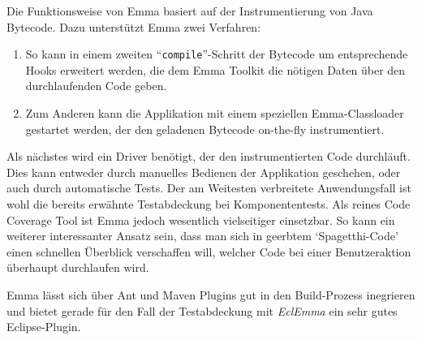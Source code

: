 Die Funktionsweise von Emma basiert auf der Instrumentierung von Java Bytecode. Dazu unterstützt Emma zwei Verfahren: \begin{enumerate}
\item So kann in einem zweiten ``\verb=compile=''-Schritt der Bytecode um entsprechende Hooks erweitert werden, die dem Emma Toolkit die nötigen Daten über den durchlaufenden Code geben.
\item Zum Anderen kann die Applikation mit einem speziellen Emma-Classloader gestartet werden, der den geladenen Bytecode on-the-fly instrumentiert. 
\end{enumerate}
Als nächstes wird ein Driver benötigt, der den instrumentierten Code durchläuft. Dies kann entweder durch manuelles Bedienen der Applikation geschehen, oder auch durch automatische Tests. Der am Weitesten verbreitete Anwendungsfall ist wohl die bereits erwähnte Testabdeckung bei Komponententests. Als reines Code Coverage Tool ist Emma jedoch wesentlich vielseitiger einsetzbar. So kann ein weiterer interessanter Ansatz sein, dass man sich in geerbtem `Spagetthi-Code' einen schnellen Überblick verschaffen will, welcher Code bei einer Benutzeraktion überhaupt durchlaufen wird.

Emma lässt sich über Ant und Maven Plugins gut in den Build-Prozess inegrieren und bietet gerade für den Fall der Testabdeckung mit \textit{EclEmma} ein sehr gutes Eclipse-Plugin.


